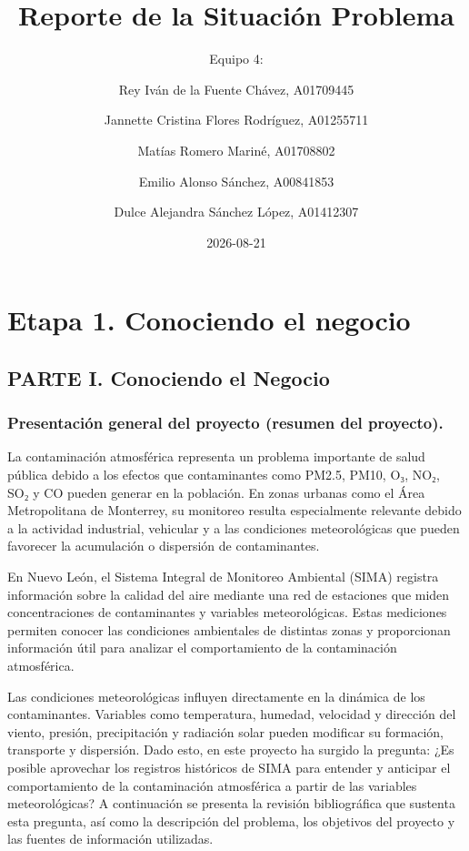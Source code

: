\documentclass[
  letterpaper,
  DIV=11,
  numbers=noendperiod]{scrartcl}
\title{Reporte de la Situación Problema}
\author{Equipo 4: \and Rey Iván de la Fuente Chávez,
A01709445 \and Jannette Cristina Flores Rodríguez, A01255711 \and Matías
Romero Mariné, A01708802 \and Emilio Alonso Sánchez,
A00841853 \and Dulce Alejandra Sánchez López, A01412307}
\date{2026-08-21}
\renewcommand*\contentsname{Table of contents}
\newcommand\contentsname{Table of contents}
\begin{document}
\maketitle

\renewcommand*\contentsname{Table of contents}
{
\setcounter{tocdepth}{3}
\tableofcontents
}

\section{Etapa 1. Conociendo el
negocio}\label{etapa-1.-conociendo-el-negocio}

\subsection{PARTE I. Conociendo el
Negocio}\label{parte-i.-conociendo-el-negocio}

\subsubsection{Presentación general del proyecto (resumen del
proyecto).}\label{presentaciuxf3n-general-del-proyecto-resumen-del-proyecto.}

La contaminación atmosférica representa un problema importante de salud
pública debido a los efectos que contaminantes como PM2.5, PM10, O₃,
NO₂, SO₂ y CO pueden generar en la población. En zonas urbanas como el
Área Metropolitana de Monterrey, su monitoreo resulta especialmente
relevante debido a la actividad industrial, vehicular y a las
condiciones meteorológicas que pueden favorecer la acumulación o
dispersión de contaminantes.

En Nuevo León, el Sistema Integral de Monitoreo Ambiental (SIMA)
registra información sobre la calidad del aire mediante una red de
estaciones que miden concentraciones de contaminantes y variables
meteorológicas. Estas mediciones permiten conocer las condiciones
ambientales de distintas zonas y proporcionan información útil para
analizar el comportamiento de la contaminación atmosférica.

Las condiciones meteorológicas influyen directamente en la dinámica de
los contaminantes. Variables como temperatura, humedad, velocidad y
dirección del viento, presión, precipitación y radiación solar pueden
modificar su formación, transporte y dispersión. Dado esto, en este
proyecto ha surgido la pregunta: ¿Es posible aprovechar los registros
históricos de SIMA para entender y anticipar el comportamiento de la
contaminación atmosférica a partir de las variables meteorológicas? A
continuación se presenta la revisión bibliográfica que sustenta esta
pregunta, así como la descripción del problema, los objetivos del
proyecto y las fuentes de información utilizadas.
\end{document}

